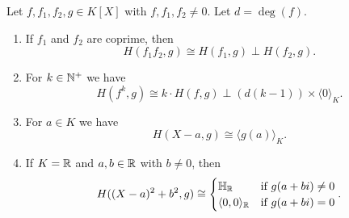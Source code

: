 \documentclass[12pt, leqno, british]{amsart}
\begin{document}
\begin{lem}\label{L:Hermite-properties}
Let $f, f_1, f_2, g \in K[X]$ with $f, f_1, f_2 \neq 0$.
Let $d = \deg(f)$.
\begin{enumerate}
\item\label{it:coprime} If $f_1$ and $f_2$ are coprime, then
$$ H(f_1f_2, g) \cong H(f_1, g) \perp H(f_2, g).$$
\item\label{it:prime-power} For $k \in \mathbb N^+$ we have
$$ H(f^k, g) \cong k \cdot H(f, g) \perp (d(k-1)) \times \langle 0 \rangle_K.$$
\item\label{it:linear} For $a \in K$ we have
$$ H(X - a, g) \cong \langle g(a) \rangle_K.$$
\item\label{it:quadratic} If $K = \mathbb R$ and $a, b \in \mathbb R$ with $b \neq 0$, then
$$ H((X-a)^2 + b^2, g) \cong \begin{cases}
\mathbb{H}_\mathbb R &\text{if } g(a+bi) \neq 0 \\
\langle 0, 0 \rangle_\mathbb R &\text{if } g(a+bi) = 0
\end{cases}.$$
\end{enumerate}
\end{lem}
\end{document}
